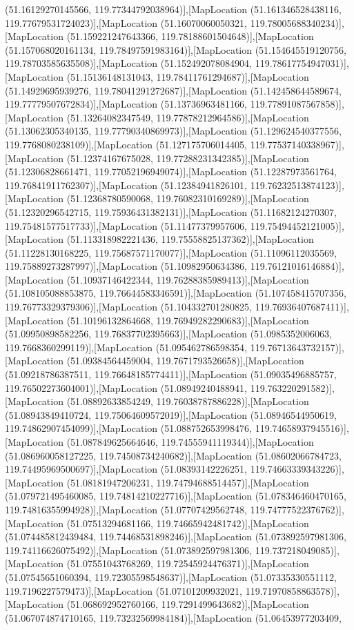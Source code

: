 (51.16129270145566, 119.77344792038964)],[MapLocation (51.161346528438116, 119.77679531724023)],[MapLocation (51.16070060050321, 119.78005688340234)],[MapLocation (51.159221247643366, 119.78188601504648)],[MapLocation (51.157068020161134, 119.78497591983164)],[MapLocation (51.154645519120756, 119.78703585635508)],[MapLocation (51.152492078084904, 119.78617754947031)],[MapLocation (51.15136148131043, 119.78411761294687)],[MapLocation (51.14929695939276, 119.78041291272687)],[MapLocation (51.142458644589674, 119.77779507672834)],[MapLocation (51.13736963481166, 119.77891087567858)],[MapLocation (51.13264082347549, 119.77878212964586)],[MapLocation (51.13062305340135, 119.77790340869973)],[MapLocation (51.129624540377556, 119.7768080238109)],[MapLocation (51.127175706014405, 119.77537140338967)],[MapLocation (51.12374167675028, 119.77288231342385)],[MapLocation (51.12306828661471, 119.77052196949074)],[MapLocation (51.12287973561764, 119.76841911762307)],[MapLocation (51.12384941826101, 119.76232513874123)],[MapLocation (51.12368780590068, 119.76082310169289)],[MapLocation (51.12320296542715, 119.75936431382131)],[MapLocation (51.11682124270307, 119.75481577517733)],[MapLocation (51.11477379957606, 119.75494452121005)],[MapLocation (51.113318982221436, 119.75558825137362)],[MapLocation (51.11228130168225, 119.75687571170077)],[MapLocation (51.11096112035569, 119.75889273287997)],[MapLocation (51.10982950634386, 119.76121016146884)],[MapLocation (51.10937146422344, 119.76288385989413)],[MapLocation (51.108105088853875, 119.76644583346591)],[MapLocation (51.107458415707356, 119.76773329379306)],[MapLocation (51.104332701280825, 119.76936407687411)],[MapLocation (51.10196132864668, 119.76949282290683)],[MapLocation (51.09950898582256, 119.76837702395663)],[MapLocation (51.0985352006063, 119.7668360299119)],[MapLocation (51.095462786598354, 119.76713643732157)],[MapLocation (51.09384564459004, 119.7671793526658)],[MapLocation (51.09218786387511, 119.76648185774411)],[MapLocation (51.09035496885757, 119.76502273604001)],[MapLocation (51.08949240488941, 119.763220291582)],[MapLocation (51.08892633854249, 119.76038787886228)],[MapLocation (51.08943849410724, 119.75064609572019)],[MapLocation (51.08946544950619, 119.74862907454099)],[MapLocation (51.088752653998476, 119.74658937945516)],[MapLocation (51.087849625664646, 119.74555941119344)],[MapLocation (51.086960058127225, 119.74508734240682)],[MapLocation (51.08602066784723, 119.74495969500697)],[MapLocation (51.08393142226251, 119.74663339343226)],[MapLocation (51.08181947206231, 119.74794688514457)],[MapLocation (51.079721495460085, 119.74814210227716)],[MapLocation (51.078346460470165, 119.74816355994928)],[MapLocation (51.07707429562748, 119.74777522376762)],[MapLocation (51.07513294681166, 119.74665942481742)],[MapLocation (51.074485812439484, 119.74468531898246)],[MapLocation (51.073892597981306, 119.74116626075492)],[MapLocation (51.073892597981306, 119.737218049085)],[MapLocation (51.07551043768269, 119.72545924476371)],[MapLocation (51.07545651060394, 119.72305598548637)],[MapLocation (51.07335330551112, 119.7196227579473)],[MapLocation (51.07101209932021, 119.71970858863578)],[MapLocation (51.068692952760166, 119.7291499643682)],[MapLocation (51.067074874710165, 119.73232569984184)],[MapLocation (51.06453977203409, 